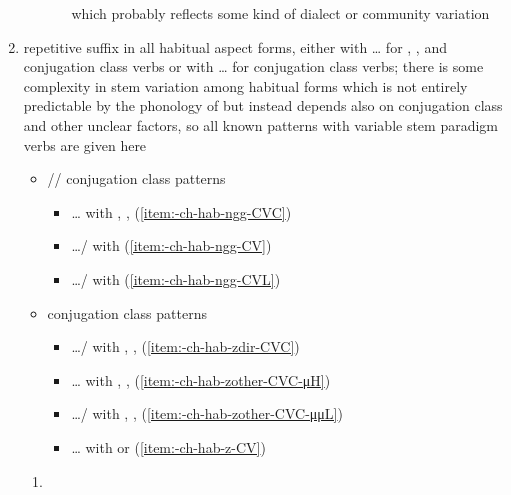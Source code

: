 \begin{morphdesc}[resume*=alphalist]
\begin{enumerate}
\begin{enumerate}
\begin{itemize}
					which probably reflects some kind of dialect
					or community variation
			\end{itemize}
		\end{enumerate}
	\item	\label{item:-ch-hab}
		repetitive suffix in all habitual aspect forms,
		either with  … 
			for , , and  conjugation class verbs
			or with  …  
			for  conjugation class verbs;
		there is some complexity in stem variation among habitual forms which is
			not entirely predictable by the phonology of 
			but instead depends also on conjugation class and other unclear factors,
			so all known patterns with variable stem paradigm verbs are given here
			\begin{itemize}
			\item	{}// conjugation class patterns
				\begin{itemize}
				\item	{}…
					with , , 
					(\ref{item:-ch-hab-ng̱g-CVC})
				\item	{}…/
					with 
					(\ref{item:-ch-hab-ng̱g-CV})
				\item	{}…/
					with 
					(\ref{item:-ch-hab-ng̱g-CVL})
				\end{itemize}
			\item	{} conjugation class patterns
				\begin{itemize}
				\item	{}…/
					with , , 
					(\ref{item:-ch-hab-zdir-CVC})
				\item	{}…
					with , , 
					(\ref{item:-ch-hab-zother-CVC-μH})
				\item	{}…/
					with , , 
					(\ref{item:-ch-hab-zother-CVC-μμL})
				\item	{}…
					with  or 
					(\ref{item:-ch-hab-z-CV})
				\end{itemize}
			\end{itemize}
		\begin{enumerate}
		\item	\label{item:-ch-hab-ng̱g}

\end{enumerate}
\end{enumerate}
\end{morphdesc}
